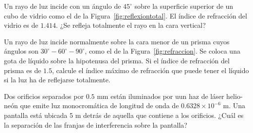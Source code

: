 \documentclass[addpoints]{exam}
\newcommand{\grado}[0]{^{\circ}}
\newcommand{\E}[1]{\times 10^{#1}}
\begin{document}
\begin{questions}
    \question Un rayo de luz incide con un ángulo de $45\grado$ sobre la superficie superior de un cubo de vidrio como el de la Figura~\ref{fig:reflexiontotal}. El índice de refracción del vidrio es de $1.414$. ¿Se refleja totalmente el rayo en la cara vertical?

    \question Un rayo de luz incide normalmente sobre la cara menor de un prisma cuyos ángulos son $30\grado - 60\grado - 90\grado$, como el de la Figura~\ref{fig:refraccion}. Se coloca una gota de líquido sobre la hipotenusa del prisma. Si el índice de refracción del prisma es de $1.5$, calcule el índice máximo de refracción que puede tener el líquido si la luz ha de reflejarse totalmente.

    \question Dos orificios separados por $0.5$ mm están iluminados por uun haz de láser helio-neón que emite luz monocromática de longitud de onda de $0.6328 \E{-6}$ m. Una pantalla está ubicada 5 m detrás de aquella que contiene a los orificios. ¿Cuál es la separación de las franjas de interferencia sobre la pantalla?

\end{questions}
\end{document}
